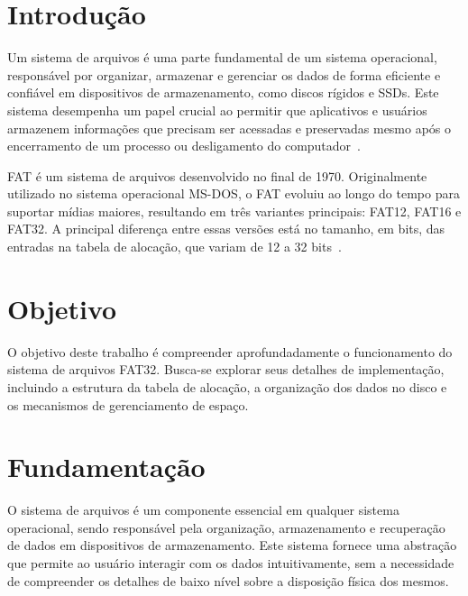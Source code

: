 \documentclass[
    12pt,				%
    oneside,   	        %
    a4paper,			%
    english,			%
    french,				%
    spanish,			%
    brazil,				%
    ]{pacotes/abntex2}
\begin{document}
\makeatletter
\renewcommand{\chapter}{\@gobbletwo}
\makeatother

\section{Introdução}
\label{sec:introducao}

Um sistema de arquivos é uma parte fundamental de um sistema operacional, responsável por organizar, armazenar e gerenciar os dados de forma eficiente e confiável em dispositivos de armazenamento, como discos rígidos e SSDs. Este sistema  desempenha um papel crucial ao permitir que aplicativos e usuários armazenem informações que precisam ser acessadas e preservadas mesmo após o encerramento de um processo ou desligamento do computador~\cite{tanenbaum2016}.

FAT é um sistema de arquivos desenvolvido no final de 1970. Originalmente utilizado no sistema operacional MS-DOS, o FAT evoluiu ao longo do tempo para suportar mídias maiores, resultando em três variantes principais: FAT12, FAT16 e FAT32. A principal diferença entre essas versões está no tamanho, em bits, das entradas na tabela de alocação, que variam de 12 a 32 bits~\cite{microsoft2000}.

\section{Objetivo}
\label{sec:objetivos}

O objetivo deste trabalho é compreender aprofundadamente o funcionamento do sistema de arquivos FAT32. Busca-se explorar seus detalhes de implementação, incluindo a estrutura da tabela de alocação, a organização dos dados no disco e os mecanismos de gerenciamento de espaço.

\section{Fundamentação}
\label{sec:fundamentacao}

O sistema de arquivos é um componente essencial em qualquer sistema operacional, sendo responsável pela organização, armazenamento e recuperação de dados em dispositivos de armazenamento. Este sistema fornece uma abstração que permite ao usuário interagir com os dados intuitivamente, sem a necessidade de compreender os detalhes de baixo nível sobre a disposição física dos mesmos.
\end{document}
